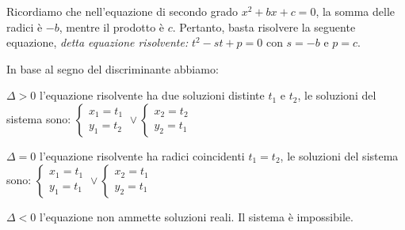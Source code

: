 Ricordiamo che nell'equazione di secondo grado $x^2+bx+c=0$, la somma delle radici è $-b$, mentre il prodotto è $c$. Pertanto, basta risolvere la seguente equazione, \emph{detta equazione risolvente: } $t^2-st+p=0$ con $s=-b$ e $p=c$.

In base al segno del discriminante abbiamo:
\begin{itemize*}
\item $\Delta >0$ l'equazione risolvente ha due soluzioni distinte $ t_1 $ e $ t_2 $, le soluzioni del sistema sono: $\left\{\begin{array}{l}{x_1=t_1}\\{y_1=t_2}\end{array}\right.\vee \left\{\begin{array}{l}{x_2=t_2}\\{y_2=t_1}\end{array}\right.$
\item $\Delta =0$ l'equazione risolvente ha radici coincidenti $t_1=t_2$, le soluzioni del sistema sono: $\left\{\begin{array}{l}{x_1=t_1}\\{y_1=t_1}\end{array}\right.\vee \left\{\begin{array}{l}{x_2=t_1}\\{y_2=t_1}\end{array}\right.$
\item $\Delta <0$ l'equazione non ammette soluzioni reali. Il sistema è impossibile.
\end{itemize*}

